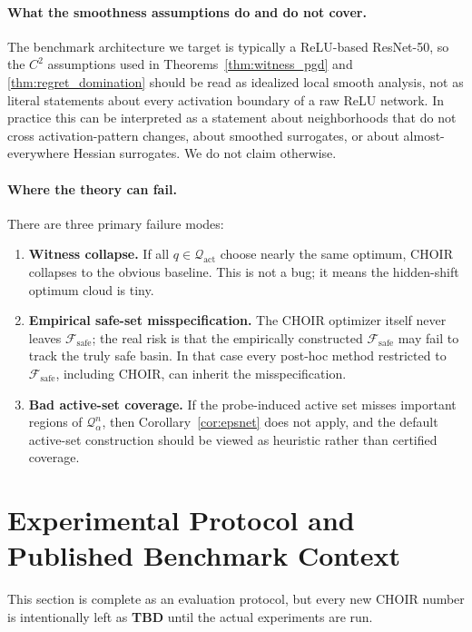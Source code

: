 \documentclass{article}
\newcommand{\cF}{\mathcal{F}}
\newcommand{\cQ}{\mathcal{Q}}
\newcommand{\TBD}{\textbf{TBD}}
\newcommand{\choir}{\textup{\textsc{CHOIR}}}
\newcommand{\safe}{\mathrm{safe}}
\newcommand{\act}{\mathrm{act}}
\begin{document}
\paragraph{What the smoothness assumptions do and do not cover.}
The benchmark architecture we target is typically a ReLU-based ResNet-50, so the \(C^2\) assumptions used in Theorems~\ref{thm:witness_pgd} and \ref{thm:regret_domination} should be read as idealized local smooth analysis, not as literal statements about every activation boundary of a raw ReLU network. In practice this can be interpreted as a statement about neighborhoods that do not cross activation-pattern changes, about smoothed surrogates, or about almost-everywhere Hessian surrogates. We do not claim otherwise.

\paragraph{Where the theory can fail.}
There are three primary failure modes:
\begin{enumerate}[leftmargin=1.4em]
    \item \textbf{Witness collapse.} If all \(q\in\cQ_{\act}\) choose nearly the same optimum, \choir{} collapses to the obvious baseline. This is not a bug; it means the hidden-shift optimum cloud is tiny.
    \item \textbf{Empirical safe-set misspecification.} The \choir{} optimizer itself never leaves \(\cF_{\safe}\); the real risk is that the empirically constructed \(\cF_{\safe}\) may fail to track the truly safe basin. In that case every post-hoc method restricted to \(\cF_{\safe}\), including \choir{}, can inherit the misspecification.
    \item \textbf{Bad active-set coverage.} If the probe-induced active set misses important regions of \(\cQ_\alpha^n\), then Corollary~\ref{cor:epsnet} does not apply, and the default active-set construction should be viewed as heuristic rather than certified coverage.
\end{enumerate}

\section{Experimental Protocol and Published Benchmark Context}
\label{sec:experiments}

This section is complete as an evaluation protocol, but every new \choir{} number is intentionally left as \TBD{} until the actual experiments are run.
\end{document}
